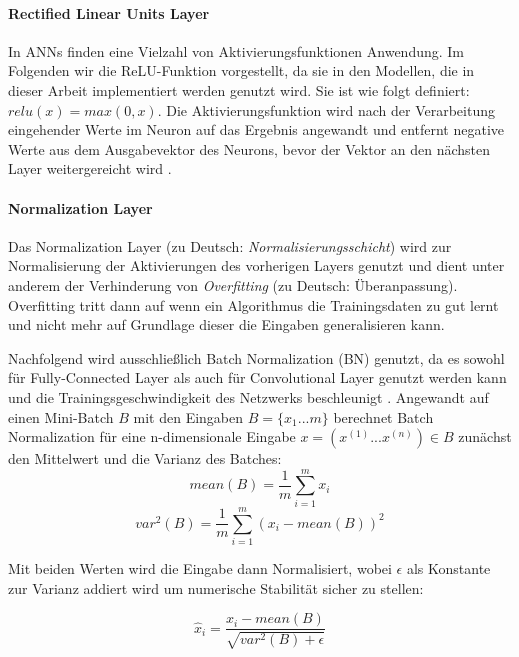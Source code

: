 \paragraph{Rectified Linear Units Layer}

In ANNs finden eine Vielzahl von Aktivierungsfunktionen Anwendung. Im Folgenden wir die ReLU-Funktion vorgestellt, da sie in den Modellen, die in dieser Arbeit implementiert werden genutzt wird. Sie ist wie folgt definiert: $relu(x) = max(0, x)$. Die Aktivierungsfunktion wird nach der Verarbeitung eingehender Werte im Neuron auf das Ergebnis angewandt und entfernt negative Werte aus dem Ausgabevektor des Neurons, bevor der Vektor an den nächsten Layer weitergereicht wird \parencite{Wu.2017}.

\paragraph{Normalization Layer}

Das Normalization Layer (zu Deutsch: \textit{Normalisierungsschicht}) wird zur Normalisierung der Aktivierungen des vorherigen Layers genutzt und dient unter anderem der Verhinderung von \textit{Overfitting} (zu Deutsch: Überanpassung). Overfitting tritt dann auf wenn ein Algorithmus die Trainingsdaten zu gut lernt und nicht mehr auf Grundlage dieser die Eingaben generalisieren kann. 

Nachfolgend wird ausschließlich Batch Normalization (BN) genutzt, da es sowohl für Fully-Connected Layer als auch für Convolutional Layer genutzt werden kann und die Trainingsgeschwindigkeit des Netzwerks beschleunigt \parencite{DBLP:conf/icml/IoffeS15}. Angewandt auf einen Mini-Batch $B$ mit den Eingaben $B = \{x_1...m\}$   berechnet Batch Normalization für eine n-dimensionale Eingabe $x = (x^{(1)} ... x^{(n)}) \in B$ zunächst den Mittelwert und die Varianz des Batches: 
\begin{equation}
	mean(B) = \frac{1}{m}\sum_{i=1}^{m} x_i
\end{equation}
\begin{equation}
	var^2(B) = \frac{1}{m}\sum_{i=1}^{m} (x_i - mean(B))^2 
\end{equation}

Mit beiden Werten wird die Eingabe dann Normalisiert, wobei $\epsilon$ als Konstante zur Varianz addiert wird um numerische Stabilität sicher zu stellen:

\begin{equation}
	\hat{x}_i = \frac{x_i - mean(B)}{\sqrt{var^2(B) + \epsilon}}
\end{equation}

